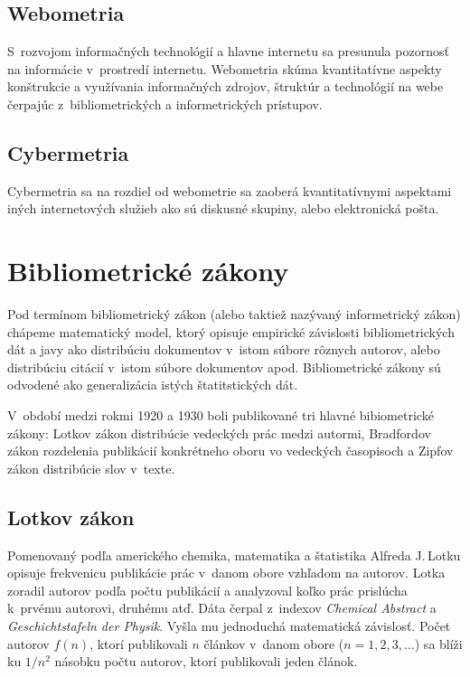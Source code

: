 \subsection{Webometria}

S~rozvojom informačných technológií a hlavne internetu sa presunula pozornosť na
informácie v~prostredí internetu.  Webometria skúma kvantitatívne aspekty
konštrukcie a využívania informačných zdrojov, štruktúr a technológií na webe
čerpajúc z~bibliometrických a informetrických prístupov.


\subsection{Cybermetria}

Cybermetria sa na rozdiel od webometrie sa zaoberá kvantitatívnymi aspektami
iných internetových služieb ako sú diskusné skupiny, alebo elektronická pošta.


\section{Bibliometrické zákony}

Pod termínom bibliometrický zákon (alebo taktiež nazývaný informetrický zákon)
chápeme matematický model, ktorý opisuje empirické závislosti bibliometrických
dát a javy ako distribúciu dokumentov v~istom súbore rôznych autorov, alebo
distribúciu citácií v~istom súbore dokumentov apod.  Bibliometrické zákony sú
odvodené ako generalizácia istých štatitstických dát. \citep{odeschini2016}

V~období medzi rokmi 1920 a 1930 boli publikované tri hlavné bibiometrické
zákony: Lotkov zákon distribúcie vedeckých prác medzi autormi, Bradfordov zákon
rozdelenia publikácií konkrétneho oboru vo vedeckých časopisoch a Zipfov
zákon
distribúcie slov v~texte. \citep{Bellis2009}


\subsection{Lotkov zákon}

Pomenovaný podľa amerického chemika, matematika a štatistika Alfreda J.\,Lotku
opisuje frekvenicu publikácie prác v~danom obore vzhľadom na autorov.  Lotka
zoradil autorov podľa počtu publikácií a analyzoval koľko prác prislúcha
k~prvému autorovi, druhému atď.  Dáta čerpal z~indexov \emph{Chemical Abstract}
a \emph{Geschichtstafeln der Physik}. \citep{Lotka1926}  Vyšla mu jednoduchá
matematická závislosť.  Počet autorov $f(n)$, ktorí publikovali $n$ článkov
v~danom obore ($n = 1, 2, 3, \dots$) sa blíži ku $1/n^2$ násobku počtu autorov,
ktorí publikovali jeden článok.


